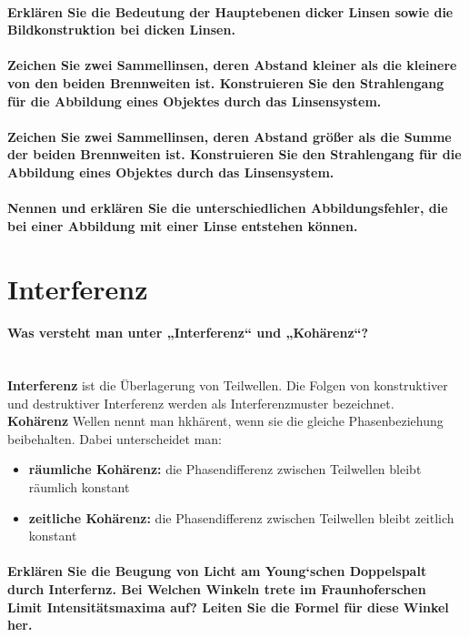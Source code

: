 \documentclass[a4paper, 11pt, parskip=half]{scrartcl}
\newcommand{\myparagraph}[1]{\paragraph{#1}\mbox{}\\}
\begin{document}
\paragraph{Erklären Sie die Bedeutung der Hauptebenen dicker Linsen sowie die Bildkonstruktion bei
dicken Linsen.}

\paragraph{Zeichen Sie zwei Sammellinsen, deren Abstand kleiner als die kleinere von den beiden
Brennweiten ist. Konstruieren Sie den Strahlengang für die Abbildung eines Objektes durch
das Linsensystem.}

\paragraph{Zeichen Sie zwei Sammellinsen, deren Abstand größer als die Summe der beiden
Brennweiten ist. Konstruieren Sie den Strahlengang für die Abbildung eines Objektes durch
das Linsensystem.}

\paragraph{Nennen und erklären Sie die unterschiedlichen Abbildungsfehler, die bei einer Abbildung
mit einer Linse entstehen können.}

\newpage
\section{Interferenz}

\myparagraph{Was versteht man unter „Interferenz“ und „Kohärenz“?}

\textbf{Interferenz} ist die Überlagerung von Teilwellen. Die Folgen von konstruktiver und destruktiver Interferenz werden als Interferenzmuster bezeichnet.\\
\textbf{Kohärenz} Wellen nennt man hkhärent, wenn sie die gleiche Phasenbeziehung beibehalten. Dabei unterscheidet man:
\begin{itemize}
    \item \textbf{räumliche Kohärenz: } die Phasendifferenz zwischen Teilwellen bleibt räumlich konstant
    \item \textbf{zeitliche Kohärenz: } die Phasendifferenz zwischen Teilwellen bleibt zeitlich konstant
\end{itemize}

\myparagraph{Erklären Sie die Beugung von Licht am Young‘schen Doppelspalt durch Interfernz. Bei
Welchen Winkeln trete im Fraunhoferschen Limit Intensitätsmaxima auf? Leiten Sie die
Formel für diese Winkel her.}
\end{document}
